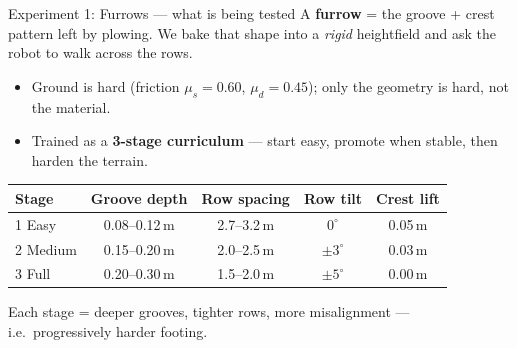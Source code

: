 \documentclass[aspectratio=169,10pt]{beamer}
\begin{document}
\begin{frame}{Experiment 1: Furrows --- what is being tested}
  A \textbf{furrow} = the groove + crest pattern left by plowing.
  We bake that shape into a \emph{rigid} heightfield and ask the robot to
  walk across the rows.

  \vspace{0.6em}
  \begin{itemize}
    \item Ground is hard (friction $\mu_s{=}0.60$, $\mu_d{=}0.45$); only the
          \alert{geometry} is hard, not the material.
    \item Trained as a \textbf{3-stage curriculum} --- start easy, promote when
          stable, then harden the terrain.
  \end{itemize}

  \vspace{0.6em}
  \begin{center}
  \begin{tabular}{lcccc}
    \toprule
    Stage & Groove depth & Row spacing & Row tilt & Crest lift \\
    \midrule
    1 Easy   & 0.08--0.12\,m & 2.7--3.2\,m & $0^\circ$           & 0.05\,m \\
    2 Medium & 0.15--0.20\,m & 2.0--2.5\,m & $\pm 3^\circ$       & 0.03\,m \\
    3 Full   & 0.20--0.30\,m & 1.5--2.0\,m & $\pm 5^\circ$       & 0.00\,m \\
    \bottomrule
  \end{tabular}
  \end{center}

  \vspace{0.4em}
  \footnotesize Each stage = deeper grooves, tighter rows, more misalignment ---
  i.e.\ progressively harder footing.
\end{frame}
\end{document}
